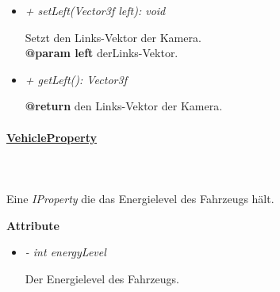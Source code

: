 \begin{itemize}
                \item \textit{+ setLeft(Vector3f left): void}
                    \begin{leftbar}[0.9\linewidth]
                        Setzt den Links-Vektor der Kamera.\\
                        \textbf{@param left} derLinks-Vektor.
                    \end{leftbar}
                \item \textit{+ getLeft(): Vector3f}
                    \begin{leftbar}[0.9\linewidth]
                        \textbf{@return} den Links-Vektor der Kamera.
                    \end{leftbar}
            \end{itemize}

        \pagebreak
        \paragraph{\underline{VehicleProperty}} \mbox{}\\
        \\
            Eine \textit{IProperty} die das Energielevel des Fahrzeugs hält.\par

            \textbf{Attribute}
            \begin{itemize}
                \item \textit{- int energyLevel}
                    \begin{leftbar}[0.9\linewidth]
                        Der Energielevel des Fahrzeugs.
                    \end{leftbar}
            \end{itemize}

